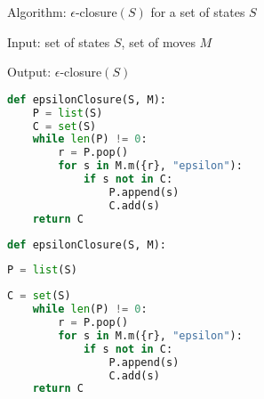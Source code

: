 \documentclass[8pt,a4paper,compress]{beamer}
\begin{document}
\begin{frame}[fragile]
\pause

\begin{tcolorbox}[enhanced,drop shadow southwest,sharp corners,size=fbox,colback=white]
\begin{minipage}{\textwidth}
Algorithm: $\epsilon$-closure$(S)$ for a set of states $S$

\smallskip

Input: set of states $S$, set of moves $M$

\smallskip

Output: $\epsilon$-closure$(S)$
\end{minipage}
\end{tcolorbox}

\begin{overprint}
\begin{tcolorbox}[enhanced,drop shadow southwest,sharp corners,size=fbox,colback=white,fontlower=\small\ttfamily,collower=silver900]

\begin{lstlisting}[language=Python,style=focusin]
def epsilonClosure(S, M):
    P = list(S)
    C = set(S)
    while len(P) != 0:
        r = P.pop()
        for s in M.m({r}, "epsilon"):
            if s not in C:
                P.append(s)
                C.add(s)
    return C
\end{lstlisting}

\tcblower
\begin{minipage}[t][.25cm][t]{\textwidth}

\end{minipage}
\end{tcolorbox}

\begin{tcolorbox}[enhanced,drop shadow southwest,sharp corners,size=fbox,colback=white,fontlower=\small\ttfamily,collower=silver900]

\begin{lstlisting}[language=Python,style=focusout]
def epsilonClosure(S, M):
\end{lstlisting}
\begin{lstlisting}[language=Python,style=focusin,backgroundcolor=\color{lime100}]
    P = list(S)
\end{lstlisting}
\begin{lstlisting}[language=Python,style=focusout]
    C = set(S)
    while len(P) != 0:
        r = P.pop()
        for s in M.m({r}, "epsilon"):
            if s not in C:
                P.append(s)
                C.add(s)
    return C
\end{lstlisting}


\end{tcolorbox}
\end{overprint}
\end{frame}
\end{document}
